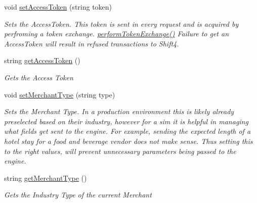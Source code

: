 \begin{DoxyCompactItemize}
void \mbox{\hyperlink{class_form_sim_1_1_generic_handler_ac2fe26607f27b8009b3d744bee7ba794}{set\+Access\+Token}} (string token)
\begin{DoxyCompactList}\small\item\em Sets the Access\+Token. This token is sent in every request and is acquired by perfroming a token exchange. \mbox{\hyperlink{class_form_sim_1_1_generic_handler_a731bd7dada7e2d13fd9c9d768bd387ee}{perform\+Token\+Exchange()}} Failure to get an Access\+Token will result in refused transactions to Shift4. \end{DoxyCompactList}\item 
string \mbox{\hyperlink{class_form_sim_1_1_generic_handler_a220e1a96282940bc7b2fe8d898aec987}{get\+Access\+Token}} ()
\begin{DoxyCompactList}\small\item\em Gets the Access Token \end{DoxyCompactList}\item 
void \mbox{\hyperlink{class_form_sim_1_1_generic_handler_a0a3b84b949b002deecb5523cec3cae23}{set\+Merchant\+Type}} (string type)
\begin{DoxyCompactList}\small\item\em Sets the Merchant Type. In a production environment this is likely already preselected based on their industry, however for a sim it is helpful in managing what fields get sent to the engine. For example, sending the expected length of a hotel stay for a food and beverage vendor does not make sense. Thus setting this to the right values, will prevent unnecessary parameters being passed to the engine. \end{DoxyCompactList}\item 
string \mbox{\hyperlink{class_form_sim_1_1_generic_handler_a9bef42bcd6992d96947612aaab8f88a7}{get\+Merchant\+Type}} ()
\begin{DoxyCompactList}\small\item\em Gets the Industry Type of the current Merchant \end{DoxyCompactList}\end{DoxyCompactItemize}

